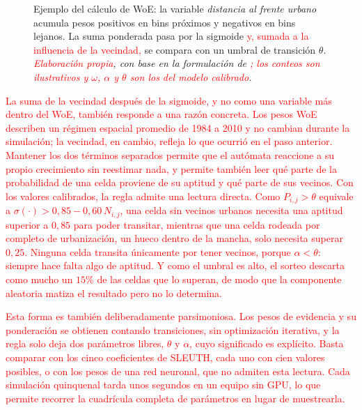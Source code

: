 \begin{figure}[htbp]
{}
  \caption{Ejemplo del cálculo de WoE: la variable \textit{distancia al frente urbano} acumula pesos positivos en bins próximos y negativos en bins lejanos. La suma ponderada pasa por la sigmoide \textcolor{red}{y, sumada a la influencia de la vecindad,} se compara con un umbral de transición $\theta$. \textit{\textcolor{red}{Elaboración propia}, con base en la formulación de \textcite{BonhamCarter1994}\textcolor{red}{; los conteos son ilustrativos y $\omega$, $\alpha$ y $\theta$ son los del modelo calibrado}.}}
  \label{fig:concepto-woe}
\end{figure}


\textcolor{red}{La suma de la vecindad después de la sigmoide, y no como una
variable más dentro del WoE, también responde a una razón concreta. Los pesos
WoE describen un régimen espacial promedio de 1984 a 2010 y no cambian durante
la simulación; la vecindad, en cambio, refleja lo que ocurrió en el paso
anterior. Mantener los dos términos separados permite que el autómata
reaccione a su propio crecimiento sin reestimar nada, y permite también leer
qué parte de la probabilidad de una celda proviene de su aptitud y qué parte
de sus vecinos. Con los valores calibrados, la regla admite una lectura
directa. Como $P_{i,j} > \theta$ equivale a
$\sigma(\cdot) > 0{,}85 - 0{,}60\,N_{i,j}$, una celda sin vecinos urbanos
necesita una aptitud superior a $0{,}85$ para poder transitar, mientras que
una celda rodeada por completo de urbanización, un hueco dentro de la mancha,
solo necesita superar $0{,}25$. Ninguna celda transita únicamente por tener
vecinos, porque $\alpha < \theta$: siempre hace falta algo de aptitud. Y como
el umbral es alto, el sorteo descarta como mucho un $15\%$ de las celdas que
lo superan, de modo que la componente aleatoria matiza el resultado pero no lo
determina.}

\textcolor{red}{Esta forma es también deliberadamente parsimoniosa. Los pesos de
evidencia y su ponderación se obtienen contando transiciones, sin
optimización iterativa, y la regla solo deja dos parámetros libres, $\theta$ y
$\alpha$, cuyo significado es explícito. Basta comparar con los cinco
coeficientes de SLEUTH, cada uno con cien valores posibles, o con los pesos de
una red neuronal, que no admiten esta lectura. Cada simulación quinquenal tarda
unos segundos en un equipo sin GPU, lo que permite recorrer la cuadrícula
completa de parámetros en lugar de muestrearla.}

